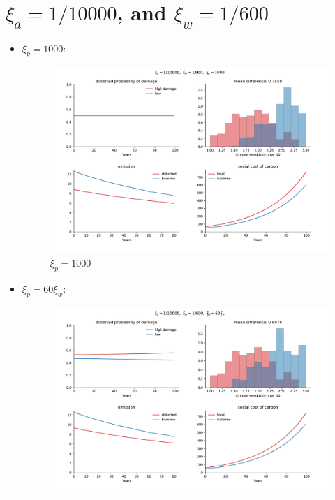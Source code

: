 \documentclass{article}
\begin{document}
\section{\(\xi_a= 1/10000\), and \(\xi_w=1/600\)}\label{sec:sec3}

\begin{itemize}
    \item$\xi_p= 1000$:
        \begin{figure}[H]
            \centering
            \includegraphics[width=\linewidth]{notebook/10_600_1000.pdf}
            \caption{$\xi_p= 1000$}
            \label{fig:notebook/10_600_1000}
        \end{figure}
        \newpage
    \item$\xi_p= 60\xi_w$:
        \begin{figure}[H]
            \centering
            \includegraphics[width=\linewidth]{notebook/10_600_60.pdf}

\end{figure}
\end{itemize}
\end{document}
